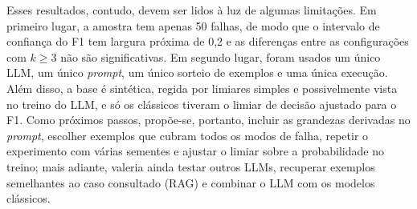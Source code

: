 \documentclass[12pt]{article}
\begin{document}
Esses resultados, contudo, devem ser lidos à luz de algumas limitações. Em primeiro lugar, a amostra tem apenas 50 falhas, de modo que o intervalo de confiança do F1 tem largura próxima de 0,2 e as diferenças entre as configurações com $k \geq 3$ não são significativas. Em segundo lugar, foram usados um único LLM, um único \textit{prompt}, um único sorteio de exemplos e uma única execução. Além disso, a base é sintética, regida por limiares simples e possivelmente vista no treino do LLM, e só os clássicos tiveram o limiar de decisão ajustado para o F1. Como próximos passos, propõe-se, portanto, incluir as grandezas derivadas no \textit{prompt}, escolher exemplos que cubram todos os modos de falha, repetir o experimento com várias sementes e ajustar o limiar sobre a probabilidade no treino; mais adiante, valeria ainda testar outros LLMs, recuperar exemplos semelhantes ao caso consultado (RAG) e combinar o LLM com os modelos clássicos.
\end{document}
